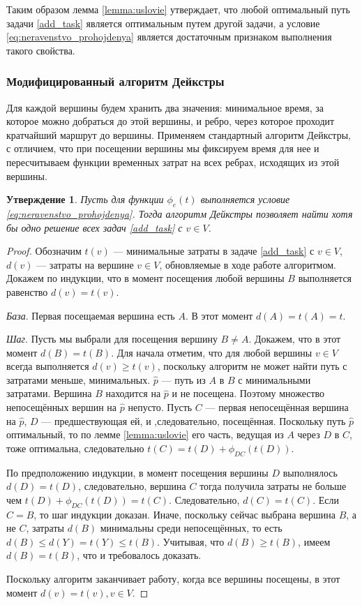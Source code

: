 \documentclass[12pt, a4paper]{article}
\newtheorem{state}{Утверждение}[section]
\begin{document}
	Таким образом лемма \ref{lemma:uslovie} утверждает, что любой оптимальный путь задачи  \eqref{add_task} является оптимальным путем другой задачи, а условие \eqref{eq:neravenstvo_prohojdenya} является достаточным признаком выполнения такого свойства.
	
	\subsubsection{Модифицированный алгоритм Дейкстры}
	
	Для каждой вершины будем хранить два значения: минимальное время, за которое можно добраться до этой вершины, и ребро, через которое проходит кратчайший маршрут до вершины.
	Применяем стандартный алгоритм Дейкстры, с отличием, что при посещении вершины мы фиксируем время для нее и пересчитываем функции временных затрат на всех ребрах, исходящих из этой вершины.
	
	\begin{state}
		Пусть для функции $\phi_e(t)$ выполняется условие \eqref{eq:neravenstvo_prohojdenya}. Тогда алгоритм Дейкстры позволяет найти хотя бы одно решение всех задач \eqref{add_task} с $v \in V$.
	\end{state}
	
	\begin{proof}
		Обозначим $t(v)$ --- минимальные затраты в задаче \eqref{add_task} с $v \in V$, $d(v)$ --- затраты на вершине $v \in V$, обновляемые в ходе работе алгоритмом. Докажем по индукции, что в момент посещения любой вершины $B$ выполняется равенство  $d(v) = t(v)$.
		
		\textit{База}. Первая посещаемая вершина есть $A$. В этот момент $d(A) = t(A) = t$.
		
		\textit{Шаг}. Пусть мы выбрали для посещения вершину $B \ne A$. Докажем, что в этот момент $d(B) = t(B)$. Для начала отметим, что для любой вершины $v \in V$ всегда выполняется $d(v)\ge t(v)$, поскольку алгоритм не может найти путь с затратами меньше, минимальных. $\widehat{p}$ — путь из $A$ в $B$ с минимальными затратами. Вершина $B$ находится на $\widehat{p}$ и не посещена. Поэтому множество непосещённых вершин на $\widehat{p}$ непусто. Пусть $C$ --- первая непосещённая вершина на $\widehat{p}$, $D$ --- предшествующая ей, и ,следовательно, посещённая. Поскольку путь $\widehat{p}$ оптимальный, то по лемме \ref{lemma:uslovie} его часть, ведущая из $A$ через $D$ в $C$, тоже оптимальна, следовательно $t(C) = t(D) + \phi_{DC}(t(D))$.
		
		По предположению индукции, в момент посещения вершины $D$ выполнялось $d(D) = t(D)$, следовательно, вершина $C$ тогда получила затраты не больше чем $t(D) + \phi_{DC}(t(D)) = t(C)$. Следовательно, $d(C) = t(C)$. Если $C = B$, то шаг индукции доказан. Иначе, поскольку сейчас выбрана вершина $B$, а не $C$, затраты $d(B)$ минимальны среди непосещённых, то есть $d(B) \le d(Y) = t(Y) \le t(B)$. Учитывая, что $d(B) \ge t(B)$, имеем $d(B) = t(B)$, что и требовалось доказать.
		
		Поскольку алгоритм заканчивает работу, когда все вершины посещены, в этот момент $d(v) = t(v), v \in V$.
	\end{proof}
\end{document}
